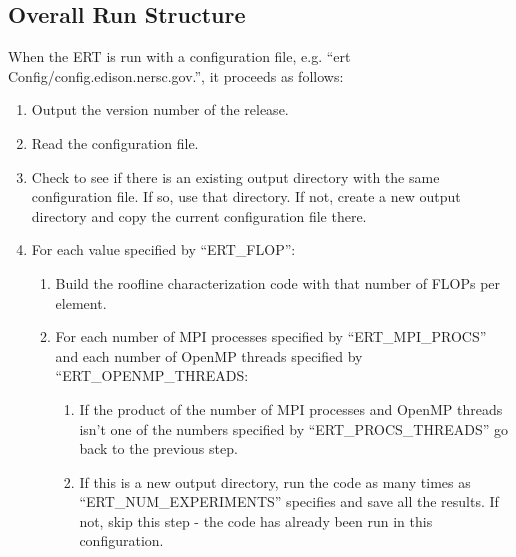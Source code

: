 \subsection{Overall Run Structure}

When the ERT is run with a configuration file, e.g.
``ert Config/\+config.\+edison.\+nersc.\+gov.'', it proceeds as
follows:

\begin{enumerate}

\vspace{-0.1in}
\item{Output the version number of the release.}

\vspace{-0.1in}
\item{Read the configuration file.}

\vspace{-0.1in}
\item{Check to see if there is an existing output directory with the same
configuration file.  If so, use that directory.  If not, create a new output
directory and copy the current configuration file there.}

\vspace{-0.1in}
\item{For each value specified by ``ERT\_\+FLOP'':}

\vspace{-0.1in}
\begin{enumerate}

\item{Build the roofline characterization code with that number of FLOPs per
element.}

\item{For each number of MPI processes specified by ``ERT\_\+MPI\_\+PROCS'' and
each number of OpenMP threads specified by ``ERT\_\+OPENMP\_\+THREADS:}

\begin{enumerate}

\item{If the product of the number of MPI processes and OpenMP threads isn't
one of the numbers specified by ``ERT\_\+PROCS\_\+THREADS'' go back to the
previous step.}

\item{If this is a new output directory, run the code as many times as
``ERT\_\+NUM\_\+EXPERIMENTS'' specifies and save all the results.  If not, skip
this step - the code has already been run in this configuration.}


\end{enumerate}
\end{enumerate}
\end{enumerate}
